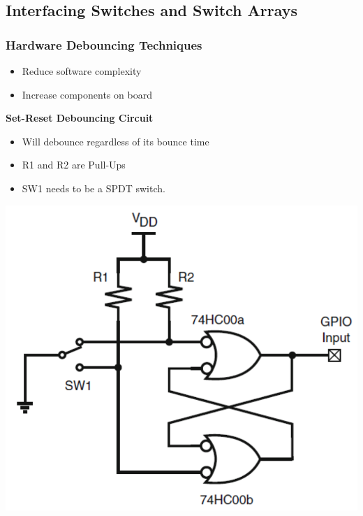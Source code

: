 \subsection{Interfacing Switches and Switch Arrays }
\subsubsection{Hardware Debouncing Techniques }
\begin{multicols}{2}
    \begin{itemize}
        \item Reduce software complexity
        \item Increase components on board
    \end{itemize}
\end{multicols}
\textbf{Set-Reset Debouncing Circuit}\newline
\begin{minipage}{0.5\linewidth}
    \begin{itemize}
        \item Will debounce regardless of its bounce time
        \item R1 and R2 are Pull-Ups
        \item SW1 needs to be a SPDT switch.
    \end{itemize}
\end{minipage}
\begin{minipage}{0.5\linewidth}
    \includegraphics[width=0.5\linewidth]{images/HWDebounceSR}  
\end{minipage}

